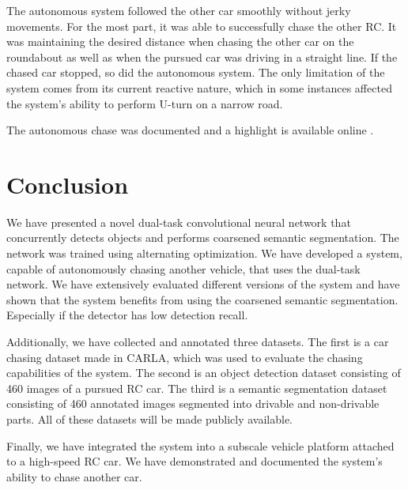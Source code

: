 \documentclass{ctuthesis/ctuthesis}
\begin{document}
The autonomous system followed the other car smoothly without jerky movements. For the most part, it was able to successfully chase the other RC. It was maintaining the desired distance when chasing the other car on the roundabout as well as when the pursued car was driving in a straight line. If the chased car stopped, so did the autonomous system. The only limitation of the system comes from its current reactive nature, which in some instances affected the system's ability to perform U-turn on a narrow road. \par

The autonomous chase was documented and a highlight is available online \cite{my_yt_video}.



\chapter{Conclusion}
We have presented a novel dual-task convolutional neural network that concurrently detects objects and performs coarsened semantic segmentation. The network was trained using alternating optimization. We have developed a system, capable of autonomously chasing another vehicle, that uses the dual-task network. We have extensively evaluated different versions of the system and have shown that the system benefits from using the coarsened semantic segmentation. Especially if the detector has low detection recall.\par
Additionally, we have collected and annotated three datasets. The first is a car chasing dataset made in CARLA, which was used to evaluate the chasing capabilities of the system. The second is an object detection dataset consisting of 460 images of a pursued RC car. The third is a semantic segmentation dataset consisting of 460 annotated images segmented into drivable and non-drivable parts. All of these datasets will be made publicly available. \par
Finally, we have integrated the system into a subscale vehicle platform attached to a high-speed RC car. We have demonstrated and documented \cite{my_yt_video} the system's ability to chase another car.



\end{document}

